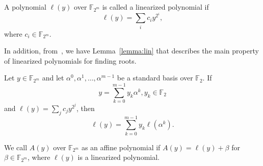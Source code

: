 \begin{definition}
A polynomial $\ell(y)$ over $\mathbb{F}_{2^m}$ is called a linearized polynomial if
\begin{equation}
    \ell(y) = \sum_i c_iy^{2^i},
\end{equation}
where $c_i \in \mathbb{F}_{2^m}$.
\end{definition}
In addition, from~\cite{truong2001fast}, we have Lemma~\ref{lemma:lin} that describes the main property of linearized polynomials for finding roots.
\begin{lemma}
\label{lemma:lin}
    Let $y \in \mathbb{F}_{2^m}$ and let $\alpha^0, \alpha^1, \ldots, \alpha^{m-1}$ be a standard basis over $\mathbb{F}_2$. If
    \begin{equation}
        y = \sum_{k=0}^{m-1} y_k\alpha^k, y_k \in \mathbb{F}_2
    \end{equation}
    and $\ell(y) =\sum_j c_jy^{2^j}$, then
      \begin{equation}
        \ell(y) = \sum_{k=0}^{m-1} y_k\ell(\alpha^k).
    \end{equation}
\end{lemma}

We call $A(y)$ over $\mathbb{F}_{2^m}$ as an affine polynomial if $A(y) = \ell(y) + \beta$ for $\beta \in \mathbb{F}_{2^m}$, where $\ell(y)$ is a linearized polynomial.

